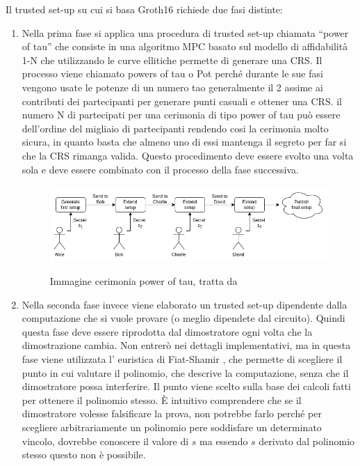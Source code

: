 Il trusted set-up su cui si basa Groth16 richiede due fasi distinte:
\begin{enumerate}
    \item Nella prima fase si applica una procedura di trusted set-up chiamata “power of tau” che consiste in una algoritmo MPC
    basato sul modello di affidabilità 1-N che utilizzando le curve ellitiche permette di generare una CRS. Il processo viene
    chiamato powers of tau o Pot perché durante le sue fasi vengono usate le potenze di un numero tao generalmente il 2
    assime ai contributi dei partecipanti per generare punti casuali e ottener una CRS. il numero N di partecipati per una
    cerimonia di tipo power of tau può essere dell'ordine del migliaio di partecipanti rendendo cosi la cerimonia molto
    sicura, in quanto basta che almeno uno di essi mantenga il segreto per far si che la CRS rimanga valida. Questo
    procedimento deve essere svolto una volta sola e deve essere combinato con il processo della fase successiva.
    \begin{figure}[H]
        \centering
        \includegraphics[width=13cm]{./chapters/1.state-of-art/images/13.power_of_tao.png}
        \label{fig:powers_of_tao}
        \captionsetup{justification=centering}
        \caption{Immagine cerimonia power of tau, tratta da \cite{how-do-trusted-setups-work}}
    \end{figure}
    \item Nella seconda fase invece viene elaborato un trusted set-up dipendente dalla computazione che si vuole provare (o
    meglio dipendete dal circuito). Quindi questa fase deve essere riprodotta dal dimostratore ogni volta che la
    dimostrazione cambia. Non entrerò nei dettagli implementativi, ma in questa fase viene utilizzata l' euristica di Fiat-Shamir
    , che permette di scegliere il punto in cui valutare il polinomio, che descrive la computazione, senza che il
    dimostratore possa interferire. Il punto viene scelto sulla base dei calcoli fatti per ottenere il polinomio stesso. È
    intuitivo comprendere che se il dimostratore volesse falsificare la prova, non potrebbe farlo perché per scegliere
    arbitrariamente un polinomio pere soddisfare un determinato vincolo, dovrebbe conoscere il valore di $s$ ma essendo
    $s$ derivato dal polinomio stesso questo non è possibile.
\end{enumerate}

